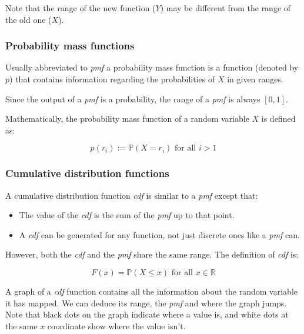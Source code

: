 Note that the range of the new function ($Y$) may be different from the range of
the old one ($X$).

\subsubsection{Probability mass functions}

Usually abbreviated to {\it pmf} a probability mass function is a function
(denoted by $p$) that contains information regarding the probabilities of $X$ in
given ranges.

Since the output of a {\it pmf} is a probability, the range of a {\it pmf} is
always $[0,1]$.

Mathematically, the probability mass function of a random variable $X$ is
defined as:

\begin{dmath*}
	p(r_i) := \mathbb{P}(X = r_i) \textrm{ for all $i > 1$}
\end{dmath*}


\subsubsection{Cumulative distribution functions}

A cumulative distribution function {\it cdf} is similar to a {\it pmf} except
that:

\begin{itemize}
	\item The value of the {\it cdf} is the sum of the {\it pmf} up to that 
	point.
	\item A {\it cdf} can be generated for any function, not just discrete ones
	like a {\it pmf} can.
\end{itemize}

However, both the {\it cdf} and the {\it pmf} share the same range. The
definition of {\it cdf} is:

\begin{dmath*}
	{F(x) = \mathbb{P}(X \leq x)} \textrm{ for all $x \in \mathbb{R}$}
\end{dmath*}

A graph of a {\it cdf} function contains all the information about the random
variable it has mapped. We can deduce its range, the {\it pmf} and where the
graph jumps. Note that black dots on the graph indicate where a value is, and
white dots at the same $x$ coordinate show where the value isn't.

